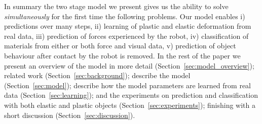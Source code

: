 \documentclass[journal]{IEEEtran}
\newcounter{algorithm}
\newenvironment{algorithmicieee}[1]
  {\refstepcounter{algorithm}
   \begin{lrbox}{\ieeealgbox}
   \begin{minipage}{\dimexpr\columnwidth-2\fboxsep-2\fboxrule}
   \textbf{Algorithm \arabic{algorithm}:} \textit{#1} \par
   \begin{algorithmic}[1]}
  {\end{algorithmic}
   \end{minipage}
   \end{lrbox}\noindent\fbox{\usebox{\ieeealgbox}}}
\newcommand{\comment}[1]{{\color{red} #1}}
\begin{document}

In summary the two stage model we present gives us the ability to solve {\em simultaneously} for the first time the following problems. Our model enables i) predictions over many steps, ii) learning of plastic and elastic deformation from real data, iii) prediction of forces experienced by the robot, iv) classification of materials from either or both force and visual data, v) prediction of object behaviour after contact by the robot is removed. In the rest of the paper we present \comment{an overview of the model in more detail (Section~\ref{sec:model_overview});} related work (Section~\ref{sec:background}); describe the model (Section~\ref{sec:model}); describe how the model parameters are learned from real data (Section~\ref{sec:learning}); and the experiments on prediction and classification with both elastic and plastic objects (Section~\ref{sec:experiments}); finishing with a short discussion (Section~\ref{sec:discussion}).
\end{document}
